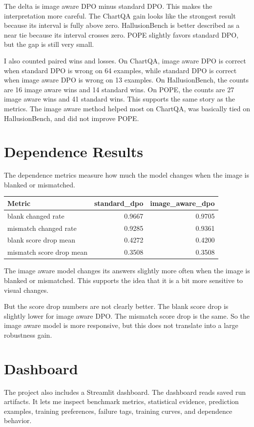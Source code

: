 \documentclass{article}
\begin{document}
The delta is image aware DPO minus standard DPO.
This makes the interpretation more careful.
The ChartQA gain looks like the strongest result because its interval is fully above zero.
HallusionBench is better described as a near tie because its interval crosses zero.
POPE slightly favors standard DPO, but the gap is still very small.

I also counted paired wins and losses.
On ChartQA, image aware DPO is correct when standard DPO is wrong on 64 examples, while standard DPO is correct when image aware DPO is wrong on 13 examples.
On HallusionBench, the counts are 16 image aware wins and 14 standard wins.
On POPE, the counts are 27 image aware wins and 41 standard wins.
This supports the same story as the metrics.
The image aware method helped most on ChartQA, was basically tied on HallusionBench, and did not improve POPE.

\section{Dependence Results}
The dependence metrics measure how much the model changes when the image is blanked or mismatched.

\begin{center}
\begin{tabular}{lrr}
\toprule
Metric & standard\_dpo & image\_aware\_dpo \\
\midrule
blank changed rate & 0.9667 & 0.9705 \\
mismatch changed rate & 0.9285 & 0.9361 \\
blank score drop mean & 0.4272 & 0.4200 \\
mismatch score drop mean & 0.3508 & 0.3508 \\
\bottomrule
\end{tabular}
\end{center}

The image aware model changes its answers slightly more often when the image is blanked or mismatched.
This supports the idea that it is a bit more sensitive to visual changes.

But the score drop numbers are not clearly better.
The blank score drop is slightly lower for image aware DPO.
The mismatch score drop is the same.
So the image aware model is more responsive, but this does not translate into a large robustness gain.

\section{Dashboard}
The project also includes a Streamlit dashboard.
The dashboard reads saved run artifacts.
It lets me inspect benchmark metrics, statistical evidence, prediction examples, training preferences, failure tags, training curves, and dependence behavior.
\end{document}

